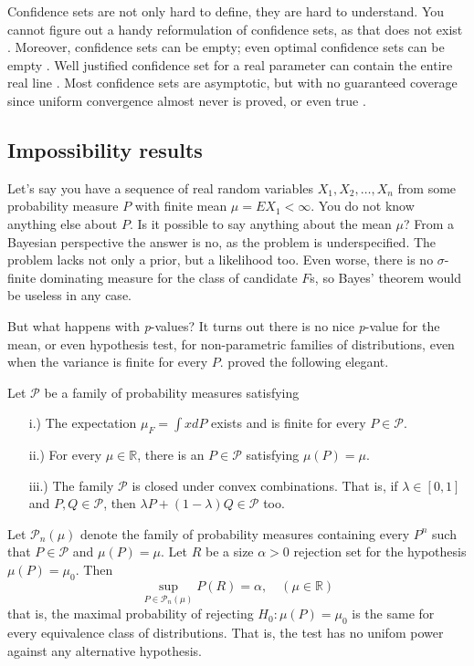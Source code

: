 Confidence sets are not only hard to define, they are hard to understand. You cannot figure out a handy reformulation of confidence sets, as that does not exist \parencite{Morey2016-ry}. Moreover, confidence sets can be empty; even optimal confidence sets can be empty \parencite[Section 3.1]{Blaker2000-ud}. Well justified confidence set for a real parameter can contain the entire real line \parencite[Section 3.2--3.3]{Blaker2000-ud}. Most confidence sets are asymptotic, but with no guaranteed coverage since uniform convergence almost never is proved, or even true \parencite{Gleser1996-kk}.

\subsection{Impossibility results}

Let's say you have a sequence of real random variables $X_{1},X_{2},\ldots,X_{n}$ from some probability measure $P$ with finite mean $\mu=EX_{1}<\infty$. You do not know anything else about $P$. Is it possible to say anything about the mean $\mu$? From a Bayesian perspective the answer is no, as the problem is underspecified. The problem lacks not only a prior, but a likelihood too. Even worse, there is no $\sigma$-finite dominating measure for the class of candidate $F$s, so Bayes' theorem would be useless in any case. 

But what happens with \emph{p}-values? It turns out there is no nice \emph{p}-value for the mean, or even hypothesis test, for non-parametric families of distributions, even when the variance is finite for every $P$. \textcite{Bahadur1956-tg} proved the following elegant.
\begin{theorem}
Let $\mathcal{\mathcal{P}}$ be a family of probability measures
satisfying
\begin{enumerate}
\item[i.)] The expectation $\mu_{F}=\int xdP$ exists and is finite for every
$P\in\mathcal{P}$.
\item[ii.)] For every $\mu\in\mathbb{R}$, there is an $P\in\mathcal{\mathcal{P}}$
satisfying $\mu(P)=\mu$.
\item[iii.)] The family $\mathcal{\mathcal{P}}$ is closed under convex combinations.
That is, if $\lambda\in[0,1]$ and $P,Q\in\mathcal{P}$, then $\lambda P+(1-\lambda)Q\in\mathcal{P}$
too.
\end{enumerate}
Let $\mathcal{P}_{n}(\mu)$ denote the family of probability measures
containing every $P^{n}$ such that $P\in\mathcal{P}$ and $\mu(P)=\mu$.
Let $R$ be a size $\alpha>0$ rejection set for the hypothesis $\mu(P)=\mu_{0}$.
Then 
\[
\sup_{P\in\mathcal{P}_{n}(\mu)}P(R)=\alpha,\quad(\mu\in\mathbb{R})
\]
that is, the maximal probability of rejecting $H_{0}:\mu(P)=\mu_{0}$
is the same for every equivalence class of distributions. That is,
the test has no unifom power against any alternative hypothesis. 
\end{theorem}

